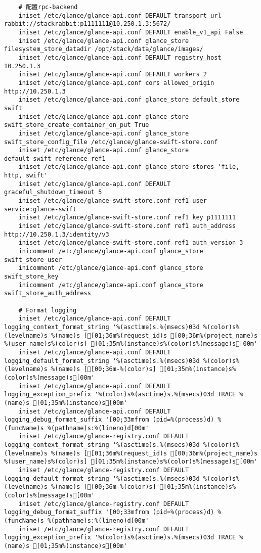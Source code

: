 \documentclass[a4paper,left=1.5cm,right=1.5cm,11pt]{article}
\begin{document}
\begin{lstlisting}
	# 配置rpc-backend
	iniset /etc/glance/glance-api.conf DEFAULT transport_url rabbit://stackrabbit:p1111111@10.250.1.3:5672/
	iniset /etc/glance/glance-api.conf DEFAULT enable_v1_api False
    iniset /etc/glance/glance-api.conf glance_store filesystem_store_datadir /opt/stack/data/glance/images/
    iniset /etc/glance/glance-api.conf DEFAULT registry_host 10.250.1.3
    iniset /etc/glance/glance-api.conf DEFAULT workers 2
	iniset /etc/glance/glance-api.conf cors allowed_origin http://10.250.1.3
	iniset /etc/glance/glance-api.conf glance_store default_store swift
    iniset /etc/glance/glance-api.conf glance_store swift_store_create_container_on_put True
	iniset /etc/glance/glance-api.conf glance_store swift_store_config_file /etc/glance/glance-swift-store.conf
    iniset /etc/glance/glance-api.conf glance_store default_swift_reference ref1
    iniset /etc/glance/glance-api.conf glance_store stores 'file, http, swift'
    iniset /etc/glance/glance-api.conf DEFAULT graceful_shutdown_timeout 5
	iniset /etc/glance/glance-swift-store.conf ref1 user service:glance-swift
    iniset /etc/glance/glance-swift-store.conf ref1 key p1111111
	iniset /etc/glance/glance-swift-store.conf ref1 auth_address http://10.250.1.3/identity/v3
    iniset /etc/glance/glance-swift-store.conf ref1 auth_version 3
    inicomment /etc/glance/glance-api.conf glance_store swift_store_user
    inicomment /etc/glance/glance-api.conf glance_store swift_store_key
    inicomment /etc/glance/glance-api.conf glance_store swift_store_auth_address
	
	# Format logging
	iniset /etc/glance/glance-api.conf DEFAULT logging_context_format_string '%(asctime)s.%(msecs)03d %(color)s%(levelname)s %(name)s [[01;36m%(request_id)s [00;36m%(project_name)s %(user_name)s%(color)s] [01;35m%(instance)s%(color)s%(message)s[00m'
    iniset /etc/glance/glance-api.conf DEFAULT logging_default_format_string '%(asctime)s.%(msecs)03d %(color)s%(levelname)s %(name)s [[00;36m-%(color)s] [01;35m%(instance)s%(color)s%(message)s[00m'
	iniset /etc/glance/glance-api.conf DEFAULT logging_exception_prefix '%(color)s%(asctime)s.%(msecs)03d TRACE %(name)s [01;35m%(instance)s[00m'
	iniset /etc/glance/glance-api.conf DEFAULT logging_debug_format_suffix '[00;33mfrom (pid=%(process)d) %(funcName)s %(pathname)s:%(lineno)d[00m'
	iniset /etc/glance/glance-registry.conf DEFAULT logging_context_format_string '%(asctime)s.%(msecs)03d %(color)s%(levelname)s %(name)s [[01;36m%(request_id)s [00;36m%(project_name)s %(user_name)s%(color)s] [01;35m%(instance)s%(color)s%(message)s[00m'
    iniset /etc/glance/glance-registry.conf DEFAULT logging_default_format_string '%(asctime)s.%(msecs)03d %(color)s%(levelname)s %(name)s [[00;36m-%(color)s] [01;35m%(instance)s%(color)s%(message)s[00m'
	iniset /etc/glance/glance-registry.conf DEFAULT logging_debug_format_suffix '[00;33mfrom (pid=%(process)d) %(funcName)s %(pathname)s:%(lineno)d[00m'
	iniset /etc/glance/glance-registry.conf DEFAULT logging_exception_prefix '%(color)s%(asctime)s.%(msecs)03d TRACE %(name)s [01;35m%(instance)s[00m'
	

\end{lstlisting}
\end{document}
